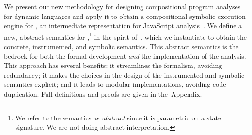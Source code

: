 
We present our new methodology for designing compositional program analyses for dynamic languages and apply it to obtain a compositional symbolic execution engine for \jsil, an intermediate representation for JavaScript analysis~\cite{javert}.
%
%
%
%
We define a new, abstract semantics for \jsil,\footnote{We refer to the semantics as \emph{abstract} since it 
is parametric on a \jsil state signature. We are not doing abstract interpretation.} in the spirit %
 of~\cite{vanhorn:icfp:2010}, which we instantiate to obtain the concrete, instrumented, and symbolic semantics. 
This abstract semantics is the bedrock for both the formal development \emph{and} the implementation of the analysis. This approach has several benefits: it streamlines the formalism, avoiding redundancy; it makes the choices in the design of the instrumented and symbolic semantics explicit; and it leads to modular implementations, avoiding code duplication.
%
Full definitions and proofs are given in the~Appendix.


